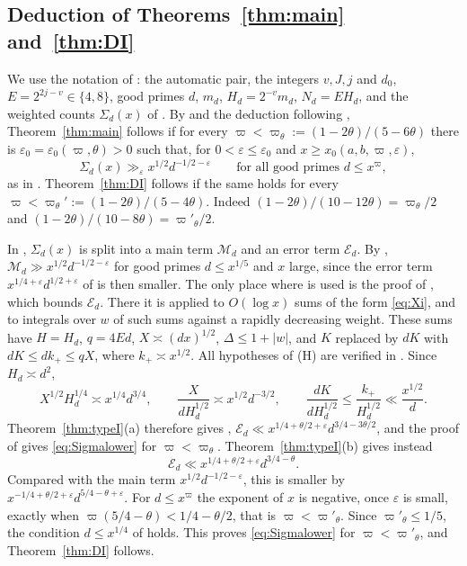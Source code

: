 \documentclass[11pt]{amsart}
\theoremstyle{remark}
\theoremstyle{definition}
\numberwithin{equation}{section}
\newcommand{\eps}{\varepsilon}
\begin{document}
\subsection{Deduction of Theorems~\ref{thm:main} and~\ref{thm:DI}}
We use the notation of \cite[\S\S2--4, 7]{II}: the automatic pair, the integers $v,J,j$ and $d_0$, $E=2^{2j-v}\in\{4,8\}$, good primes $d$, $m_d$, $H_d=2^{-v}m_d$, $N_d=EH_d$, and the weighted counts $\Sigma_d(x)$ of \cite[(4.3)]{II}. By \cite[Proposition~4.2]{II} and the deduction following \cite[Theorem~4.3]{II}, Theorem~\ref{thm:main} follows if for every $\varpi<\varpi_\theta:=(1-2\theta)/(5-6\theta)$ there is $\eps_0=\eps_0(\varpi,\theta)>0$ such that, for $0<\eps\le\eps_0$ and $x\ge x_0(a,b,\varpi,\eps)$,
\begin{equation}\label{eq:Sigmalower}
\Sigma_d(x)\gg_\eps x^{1/2}d^{-1/2-\eps}\qquad\text{for all good primes }d\le x^\varpi,
\end{equation}
as in \cite[Theorem~4.3]{II}. Theorem~\ref{thm:DI} follows if the same holds for every $\varpi<\varpi_\theta':=(1-2\theta)/(5-4\theta)$. Indeed $(1-2\theta)/(10-12\theta)=\varpi_\theta/2$ and $(1-2\theta)/(10-8\theta)=\varpi'_\theta/2$.

In \cite[\S7]{II}, $\Sigma_d(x)$ is split into a main term $\mathcal M_d$ and an error term $\mathcal E_d$. By \cite[Lemmas~7.2 and~5.3(d)]{II}, $\mathcal M_d\gg x^{1/2}d^{-1/2-\eps}$ for good primes $d\le x^{1/5}$ and $x$ large, since the error term $x^{1/4+\eps}d^{1/2+\eps}$ of \cite[Lemma~7.2]{II} is then smaller. The only place where \cite[Proposition~6.5]{II} is used is the proof of \cite[Lemma~7.3]{II}, which bounds $\mathcal E_d$. There it is applied to $O(\log x)$ sums of the form \eqref{eq:Xi}, and to integrals over $w$ of such sums against a rapidly decreasing weight. These sums have $H=H_d$, $q=4Ed$, $X\asymp(dx)^{1/2}$, $\Delta\le1+|w|$, and $K$ replaced by $dK$ with $dK\le dk_+\le qX$, where $k_+\asymp x^{1/2}$. All hypotheses of (H) are verified in \cite[\S7]{II}. Since $H_d\asymp d^2$,
\[
X^{1/2}H_d^{1/4}\asymp x^{1/4}d^{3/4},\qquad\frac{X}{dH_d^{1/2}}\asymp x^{1/2}d^{-3/2},\qquad\frac{dK}{dH_d^{1/2}}\le\frac{k_+}{H_d^{1/2}}\ll\frac{x^{1/2}}{d}.
\]
Theorem~\ref{thm:typeI}(a) therefore gives \cite[Lemma~7.3]{II}, $\mathcal E_d\ll x^{1/4+\theta/2+\eps}d^{3/4-3\theta/2}$, and the proof of \cite[Theorem~4.3]{II} gives \eqref{eq:Sigmalower} for $\varpi<\varpi_\theta$. Theorem~\ref{thm:typeI}(b) gives instead
\[
\mathcal E_d\ll x^{1/4+\theta/2+\eps}d^{3/4-\theta}.
\]
Compared with the main term $x^{1/2}d^{-1/2-\eps}$, this is smaller by $x^{-1/4+\theta/2+\eps}d^{5/4-\theta+\eps}$. For $d\le x^\varpi$ the exponent of $x$ is negative, once $\eps$ is small, exactly when $\varpi(5/4-\theta)<1/4-\theta/2$, that is $\varpi<\varpi'_\theta$. Since $\varpi'_\theta\le1/5$, the condition $d\le x^{1/4}$ of \cite[(7.1)]{II} holds. This proves \eqref{eq:Sigmalower} for $\varpi<\varpi'_\theta$, and Theorem~\ref{thm:DI} follows.
\end{document}
